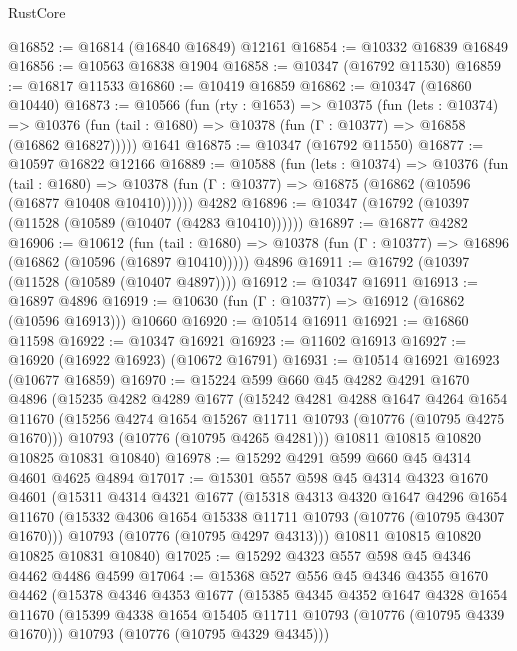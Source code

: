 \begin{lexlean}{RustCore}
\begin{coremodule}
@16852 := @16814 (@16840 @16849) @12161
@16854 := @10332 @16839 @16849
@16856 := @10563 @16838 @1904
@16858 := @10347 (@16792 @11530)
@16859 := @16817 @11533
@16860 := @10419 @16859
@16862 := @10347 (@16860 @10440)
@16873 := @10566
    (fun (rty : @1653) =>
    @10375
      (fun (lets : @10374) =>
      @10376 (fun (tail : @1680) => @10378 (fun (Γ : @10377) => @16858 (@16862 @16827)))))
    @1641
@16875 := @10347 (@16792 @11550)
@16877 := @10597 @16822 @12166
@16889 := @10588
    (fun (lets : @10374) =>
    @10376
      (fun (tail : @1680) =>
      @10378 (fun (Γ : @10377) => @16875 (@16862 (@10596 (@16877 @10408 @10410))))))
    @4282
@16896 := @10347 (@16792 (@10397 (@11528 (@10589 (@10407 (@4283 @10410))))))
@16897 := @16877 @4282
@16906 := @10612
    (fun (tail : @1680) => @10378 (fun (Γ : @10377) => @16896 (@16862 (@10596 (@16897 @10410)))))
    @4896
@16911 := @16792 (@10397 (@11528 (@10589 (@10407 @4897))))
@16912 := @10347 @16911
@16913 := @16897 @4896
@16919 := @10630 (fun (Γ : @10377) => @16912 (@16862 (@10596 @16913))) @10660
@16920 := @10514 @16911
@16921 := @16860 @11598
@16922 := @10347 @16921
@16923 := @11602 @16913
@16927 := @16920 (@16922 @16923) (@10672 @16791)
@16931 := @10514 @16921 @16923 (@10677 @16859)
@16970 := @15224
    @599
    @660
    @45
    @4282
    @4291
    @1670
    @4896
    (@15235
      @4282
      @4289
      @1677
      (@15242
        @4281
        @4288
        @1647
        @4264
        @1654
        @11670
        (@15256 @4274 @1654 @15267 @11711 @10793 (@10776 (@10795 @4275 @1670)))
        @10793
        (@10776 (@10795 @4265 @4281)))
      @10811
      @10815
      @10820
      @10825
      @10831
      @10840)
@16978 := @15292 @4291 @599 @660 @45 @4314 @4601 @4625 @4894
@17017 := @15301
    @557
    @598
    @45
    @4314
    @4323
    @1670
    @4601
    (@15311
      @4314
      @4321
      @1677
      (@15318
        @4313
        @4320
        @1647
        @4296
        @1654
        @11670
        (@15332 @4306 @1654 @15338 @11711 @10793 (@10776 (@10795 @4307 @1670)))
        @10793
        (@10776 (@10795 @4297 @4313)))
      @10811
      @10815
      @10820
      @10825
      @10831
      @10840)
@17025 := @15292 @4323 @557 @598 @45 @4346 @4462 @4486 @4599
@17064 := @15368
    @527
    @556
    @45
    @4346
    @4355
    @1670
    @4462
    (@15378
      @4346
      @4353
      @1677
      (@15385
        @4345
        @4352
        @1647
        @4328
        @1654
        @11670
        (@15399 @4338 @1654 @15405 @11711 @10793 (@10776 (@10795 @4339 @1670)))
        @10793
        (@10776 (@10795 @4329 @4345)))

\end{coremodule}
\end{lexlean}

